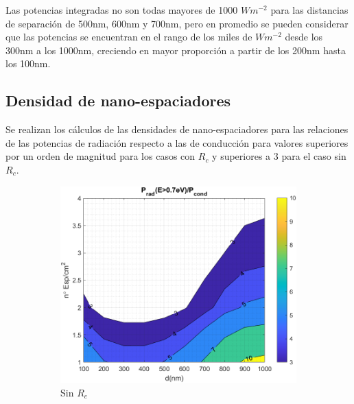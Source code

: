 Las potencias integradas no son todas mayores de 1000 $Wm^{-2}$ para las distancias de separación de 500nm, 600nm y 700nm, pero en promedio se pueden considerar que las potencias se encuentran en el rango de los miles de $Wm^{-2}$ desde los 300nm a los 1000nm, creciendo en mayor proporción a partir de los 200nm hasta los 100nm.
\subsection{Densidad de nano-espaciadores}
Se realizan los cálculos de las densidades de nano-espaciadores para las relaciones de las potencias de radiación respecto a las de conducción para valores superiores por un orden de magnitud para los casos con $R_c$ y superiores a 3 para el caso sin $R_c$.
\begin{figure}[H]
	\centering
	\begin{subfigure}[b]{0.49\textwidth}
		\centering
			\includegraphics[width=1.00\textwidth]{figuras/Resultados/RelacionCondRad/SS.png}
		\caption{Sin $R_c$}
		\label{fig:rel_SsSiO2Ge}
	\end{subfigure}
	\hfill
	\begin{subfigure}[b]{0.49\textwidth}
		\centering

\end{subfigure}
\end{figure}
